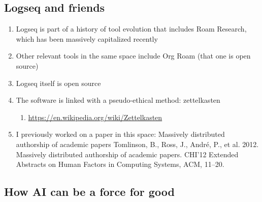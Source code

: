 \documentclass[11pt]{article}
\begin{document}
\subsection{Logseq and friends}
\label{sec:orge34f081}

\begin{enumerate}
\item Logseq is part of a history of tool evolution that includes Roam Research, which has been massively capitalized recently
\label{sec:org8d52c30}
\item Other relevant tools in the same space include Org Roam (that one is open source)
\label{sec:orgfb71d50}
\item Logseq itself is open source
\label{sec:orgbb4dc3b}
\item The software is linked with a pseudo-ethical method: zettelkasten
\label{sec:org90e5d61}
\begin{enumerate}
\item \url{https://en.wikipedia.org/wiki/Zettelkasten}
\label{sec:orgf3e1eeb}
\end{enumerate}
\item I previously worked on a paper in this space: Massively distributed authorship of academic papers
\label{sec:org3b94fe2}
Tomlinson, B., Ross, J., André, P., et al. 2012. Massively distributed authorship of academic papers. CHI’12 Extended Abstracts on Human Factors in Computing Systems, ACM, 11–20.
\end{enumerate}



\subsection{How AI can be a force for good}
\label{sec:orgbedef93}
\end{document}
